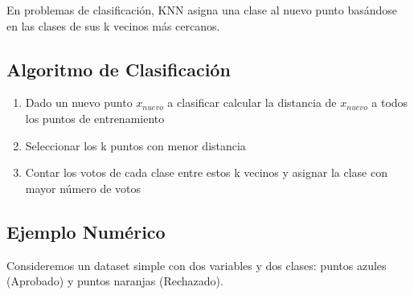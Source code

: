 \documentclass[12pt]{article}
\begin{document}
En problemas de clasificación, KNN asigna una clase al nuevo punto basándose en las clases de sus k vecinos más cercanos.

\subsection{Algoritmo de Clasificación}

\begin{enumerate}
    \item Dado un nuevo punto $x_{nuevo}$ a clasificar calcular la distancia de $x_{nuevo}$ a todos los puntos de entrenamiento
    \item Seleccionar los k puntos con menor distancia
    \item Contar los votos de cada clase entre estos k vecinos y asignar la clase con mayor número de votos
\end{enumerate}

\subsection{Ejemplo Numérico}

Consideremos un dataset simple con dos variables y dos clases: puntos azules (Aprobado) y puntos naranjas (Rechazado).
\end{document}
